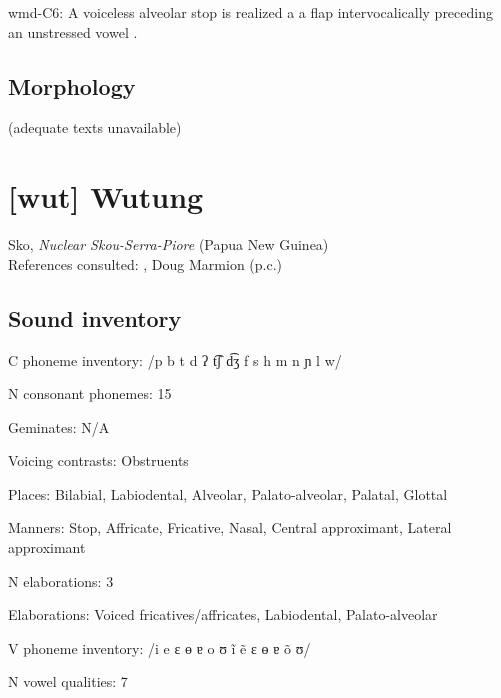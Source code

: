 {\begin{appendixdesc}
\item[wmd-C6:] A voiceless alveolar stop is realized a a flap intervocalically preceding an unstressed vowel \citep[55]{Eberhard2009}.
\end{appendixdesc}
\subsection*{Morphology}

(adequate texts unavailable)

\section*{[wut] Wutung}   %
Sko, \textit{Nuclear Skou-Serra-Piore} (Papua New Guinea)\medskip\\
References consulted: \citet{Marmion2010}, Doug Marmion (p.c.)

\subsection*{Sound inventory}
\begin{appendixdesc}

\item[C phoneme inventory:] /p b t d ʔ t͡ʃ d͡ʒ f s h m n ɲ l w/

\item[N consonant phonemes:] 15

\item[Geminates:] N/A

\item[Voicing contrasts:] Obstruents

\item[Places:] Bilabial, Labiodental, Alveolar, Palato-alveolar, Palatal, Glottal

\item[Manners:] Stop, Affricate, Fricative, Nasal, Central approximant, Lateral approximant

\item[N elaborations:] 3

\item[Elaborations:] Voiced fricatives/affricates, Labiodental, Palato-alveolar

\item[V phoneme inventory:] /i e ɛ ɵ ɐ o ʊ ĩ ẽ ɛ ɵ ɐ õ ʊ/

\item[N vowel qualities:] 7


\end{appendixdesc}}
